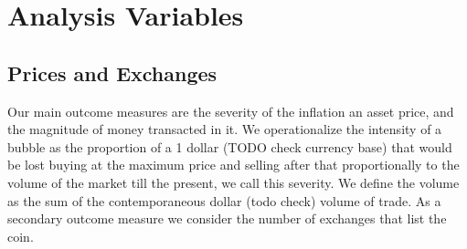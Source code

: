 
\section{Analysis Variables}
\subsection{Prices and Exchanges}
Our main outcome measures are the severity of the inflation an asset price, and the magnitude of money transacted in it.
We operationalize the intensity of a bubble as the proportion of a 1 dollar (TODO check currency base) that would be lost buying at the maximum price and selling after that proportionally to the volume of the market till the present, we call this severity.
We define the volume as the sum of the contemporaneous dollar (todo check) volume of trade.
As a secondary outcome measure we consider the number of exchanges that list the coin.
